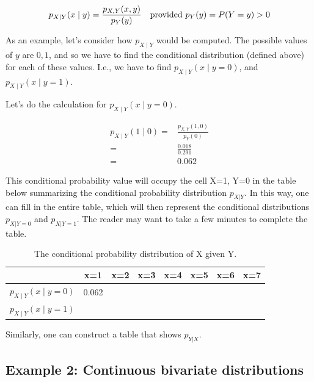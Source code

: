 \documentclass[12pt,]{krantz}
\theoremstyle{definition}
\theoremstyle{definition}
\theoremstyle{definition}
\theoremstyle{remark}
\begin{document}
\begin{equation}
p_{X\mid Y} (x\mid y) = \frac{p_{X,Y}(x,y)}{p_Y(y)} \quad \hbox{provided } p_Y(y)=P(Y=y)>0
\end{equation}

As an example, let's consider how \(p_{X\mid Y}\) would be computed. The
possible values of \(y\) are \(0,1\), and so we have to find the
conditional distribution (defined above) for each of these values. I.e.,
we have to find \(p_{X\mid Y}(x\mid y=0)\), and
\(p_{X\mid Y}(x\mid y=1)\).

Let's do the calculation for \(p_{X\mid Y}(x\mid y=0)\).

\begin{equation}
\begin{split}
p_{X\mid Y} (1\mid 0) =& \frac{p_{X,Y}(1,0)}{p_Y(0)}\\
    =&  \frac{0.018}{0.291}\\
    =& 0.062
\end{split} 
\end{equation}

This conditional probability value will occupy the cell X=1, Y=0 in the
table below summarizing the conditional probability distribution
\(p_{X|Y}\). In this way, one can fill in the entire table, which will
then represent the conditional distributions \(p_{X|Y=0}\) and
\(p_{X|Y=1}\). The reader may want to take a few minutes to complete the
table.

\begin{table}[!htbp]
\begin{center}
\begin{tabular}{c|ccccccc}
    & x=1 & x=2 & x=3 & x=4 & x=5 & x=6 & x=7\\ 
\hline  
$p_{X\mid Y}(x\mid y=0)$  & 0.062 &  & & & & & \\
$p_{X\mid Y}(x\mid y=1)$  &  &  & & & & &  \\
\end{tabular}
\end{center}
\caption{The conditional probability distribution of X given Y.}
\label{XgivenY}
\end{table}

Similarly, one can construct a table that shows \(p_{Y|X}\).

\subsection{Example 2: Continuous bivariate
distributions}\label{example-2-continuous-bivariate-distributions}
\end{document}
